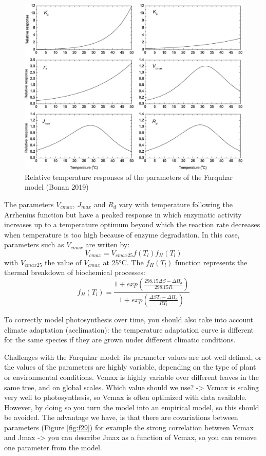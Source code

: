 \documentclass[12pt,oneside]{book}
\begin{document}
\begin{figure}

{\centering \includegraphics[width=0.8\linewidth]{figures/chap2/temp_responses} 

}

\caption{Relative temperature responses of the parameters of the Farquhar model (Bonan 2019)}\label{fig:f28bis}
\end{figure}

The parameters \(V_{cmax}\), \(J_{max}\) and \(R_d\) vary with
temperature following the Arrhenius function but have a peaked response
in which enzymatic activity increases up to a temperature optimum beyond
which the reaction rate decreases when temperature is too high because
of enzyme degradation. In this case, parameters such as \(V_{cmax}\) are
writen by: \[
V_{cmax}=V_{cmax25}f(T_l)f_H(T_l)
\] with \(V_{cmax25}\) the value of \(V_{cmax}\) at 25°C. The
\(f_H(T_l)\) function represents the thermal breakdown of biochemical
processes: \[
f_H(T_l)=\frac{1+exp\left(\frac{298.15\Delta S-\Delta H_d}{298.15R}\right)}{1+exp\left(\frac{\Delta ST_l-\Delta H_d}{RT_l}\right)}
\]

To correctly model photosynthesis over time, you should also take into
account climate adaptation (acclimation): the temperature adaptation
curve is different for the same species if they are grown under
different climatic conditions.

Challenges with the Farquhar model: its parameter values are not well
defined, or the values of the parameters are highly variable, depending
on the type of plant or environmental conditions. Vcmax is highly
variable over different leaves in the same tree, and on global scales.
Which value should we use? -\textgreater{} Vcmax is scaling very well to
photosynthesis, so Vcmax is often optimized with data available.
However, by doing so you turn the model into an empirical model, so this
should be avoided. The advantage we have, is that there are covariations
between parameters (Figure \ref{fig:f29}) for example the strong
correlation between Vcmax and Jmax -\textgreater{} you can describe Jmax
as a function of Vcmax, so you can remove one parameter from the model.
\end{document}
